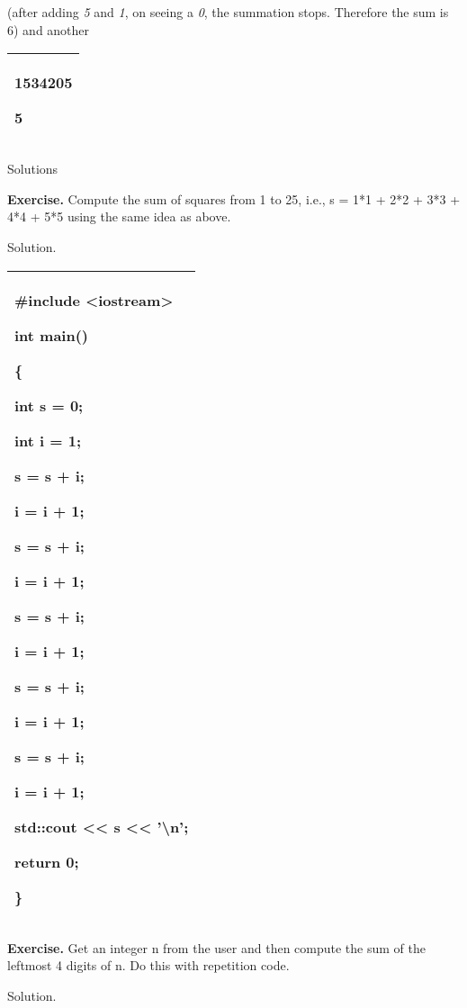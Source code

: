 \documentclass[
]{article}
\begin{document}
(after adding \emph{5} and \emph{1}, on seeing a \emph{0}, the summation
stops. Therefore the sum is 6) and another

\begin{longtable}[]{@{}l@{}}
\toprule
\endhead
\begin{minipage}[t]{0.97\columnwidth}\raggedright
\textbf{1534205}

5\strut
\end{minipage}\tabularnewline
\bottomrule
\end{longtable}

Solutions

\textbf{Exercise.} Compute the sum of squares from 1 to 25, i.e., s =
1*1 + 2*2 + 3*3 + 4*4 + 5*5 using the same idea as above.

\protect\hypertarget{anchor}{}{}Solution.

\begin{longtable}[]{@{}l@{}}
\toprule
\endhead
\begin{minipage}[t]{0.97\columnwidth}\raggedright
\#include \textless iostream\textgreater{}

int main()

\{

int s = 0;

int i = 1;

s = s + i;

i = i + 1;

s = s + i;

i = i + 1;

s = s + i;

i = i + 1;

s = s + i;

i = i + 1;

s = s + i;

i = i + 1;

std::cout \textless\textless{} s \textless\textless{}
'\textbackslash n';

return 0;

\}\strut
\end{minipage}\tabularnewline
\bottomrule
\end{longtable}

\textbf{Exercise.} Get an integer n from the user and then compute the
sum of the leftmost 4 digits of n. Do this with repetition code.

\protect\hypertarget{anchor-1}{}{}Solution.
\end{document}
